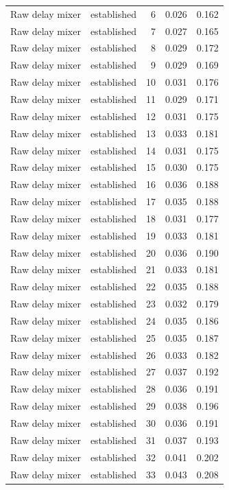 \begin{tabular}{llrrr}
Raw delay mixer & established & 6 & 0.026 & 0.162 \\
Raw delay mixer & established & 7 & 0.027 & 0.165 \\
Raw delay mixer & established & 8 & 0.029 & 0.172 \\
Raw delay mixer & established & 9 & 0.029 & 0.169 \\
Raw delay mixer & established & 10 & 0.031 & 0.176 \\
Raw delay mixer & established & 11 & 0.029 & 0.171 \\
Raw delay mixer & established & 12 & 0.031 & 0.175 \\
Raw delay mixer & established & 13 & 0.033 & 0.181 \\
Raw delay mixer & established & 14 & 0.031 & 0.175 \\
Raw delay mixer & established & 15 & 0.030 & 0.175 \\
Raw delay mixer & established & 16 & 0.036 & 0.188 \\
Raw delay mixer & established & 17 & 0.035 & 0.188 \\
Raw delay mixer & established & 18 & 0.031 & 0.177 \\
Raw delay mixer & established & 19 & 0.033 & 0.181 \\
Raw delay mixer & established & 20 & 0.036 & 0.190 \\
Raw delay mixer & established & 21 & 0.033 & 0.181 \\
Raw delay mixer & established & 22 & 0.035 & 0.188 \\
Raw delay mixer & established & 23 & 0.032 & 0.179 \\
Raw delay mixer & established & 24 & 0.035 & 0.186 \\
Raw delay mixer & established & 25 & 0.035 & 0.187 \\
Raw delay mixer & established & 26 & 0.033 & 0.182 \\
Raw delay mixer & established & 27 & 0.037 & 0.192 \\
Raw delay mixer & established & 28 & 0.036 & 0.191 \\
Raw delay mixer & established & 29 & 0.038 & 0.196 \\
Raw delay mixer & established & 30 & 0.036 & 0.191 \\
Raw delay mixer & established & 31 & 0.037 & 0.193 \\
Raw delay mixer & established & 32 & 0.041 & 0.202 \\
Raw delay mixer & established & 33 & 0.043 & 0.208 \\

\end{tabular}
